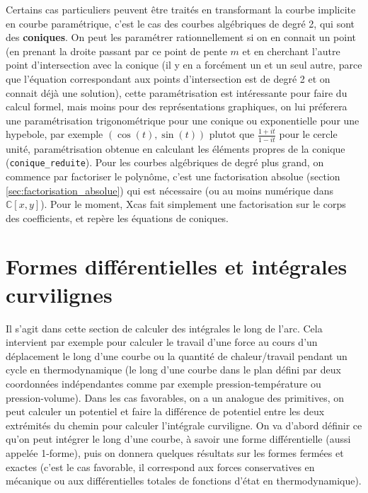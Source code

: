 \documentclass[a4paper,11pt]{article}
\newcommand{\C}{{\mathbb{C}}}
\begin{document}
\begin{giacjshere}
Certains cas particuliers peuvent \^etre trait\'es en
transformant la courbe implicite en courbe param\'etrique,
c'est le cas des courbes alg\'ebriques de degr\'e 2, qui
sont des {\bf coniques}. On peut les param\'etrer rationnellement
si on en connait un point (en prenant la droite passant par ce point
de pente $m$ et en cherchant l'autre point d'intersection
avec la conique (il y en a forc\'ement un et un seul autre,
parce que l'\'equation correspondant aux points
d'intersection est de degr\'e 2
et on connait d\'ej\`a une solution), cette param\'etrisation
est int\'eressante pour faire du calcul formel, mais moins
pour des repr\'esentations graphiques, on lui pr\'eferera
une param\'etrisation trigonom\'etrique pour une conique
ou exponentielle pour une hypebole, par exemple
$(\cos(t),\sin(t))$ plutot que $\frac{1+it}{1-it}$ pour
le cercle unit\'e, param\'etrisation obtenue en calculant
les \'el\'ements propres de la conique (\verb|conique_reduite|). 
Pour les courbes alg\'ebriques de degr\'e
plus grand, on commence par factoriser le polyn\^ome,
c'est une factorisation absolue (section \ref{sec:factorisation_absolue}) qui est n\'ecessaire (ou
au moins num\'erique dans $\C[x,y]$). Pour le moment,
Xcas fait simplement une factorisation sur le corps
des coefficients, et rep\`ere les \'equations de coniques.


\section{Formes diff\'erentielles et int\'egrales curvilignes} 
\label{sec:diff}
Il s'agit dans cette section de calculer des int\'egrales
le long de l'arc. Cela intervient
par exemple pour calculer le travail d'une force au cours d'un
d\'eplacement le long d'une courbe 
ou la quantit\'e de chaleur/travail pendant
un cycle en thermodynamique (le long d'une courbe
dans le plan d\'efini par deux coordonn\'ees ind\'ependantes 
comme par exemple pression-temp\'erature ou pression-volume). 
Dans les cas favorables, on a un analogue des primitives, on peut
calculer un potentiel et faire la diff\'erence de potentiel entre les
deux extr\'emit\'es du chemin pour calculer l'int\'egrale curviligne.
On va d'abord d\'efinir ce
qu'on peut int\'egrer le long d'une courbe, \`a savoir une
forme diff\'erentielle (aussi appel\'ee 1-forme), puis on
donnera quelques r\'esultats sur les formes ferm\'ees et
exactes (c'est le cas favorable, il correspond aux forces
conservatives en m\'ecanique ou aux diff\'erentielles totales
de fonctions d'\'etat en thermodynamique).


\end{giacjshere}
\end{document}
